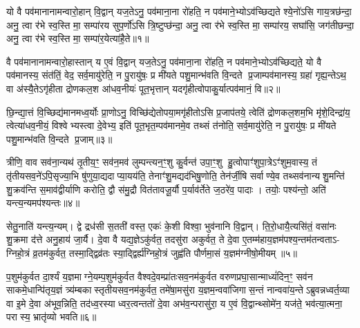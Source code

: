 \setcounter{anuvakam}{0}
यो वै पव॑मानानामन्वारो॒हान् वि॒द्वान् यज॒तेऽनु॒ पव॑माना॒ना रो॑हति॒ न पव॑माने॒भ्योऽव॑च्छिद्यते श्ये॒नो॑ऽसि गाय॒त्रछ॑न्दा॒ अनु॒ त्वा र॑भे स्व॒स्ति मा॒ सम्पा॑रय सुप॒र्णो॑ऽसि त्रि॒ष्टुप्छ॑न्दा॒ अनु॒ त्वा र॑भे स्व॒स्ति मा॒ सम्पा॑रय॒ सघा॑सि॒ जग॑तीछन्दा॒ अनु॒ त्वा र॑भे स्व॒स्ति मा॒ सम्पा॑र॒येत्या॑है॒ते॥१॥

वै पव॑मानानामन्वारो॒हास्तान् य ए॒वं वि॒द्वान् यज॒तेऽनु॒ पव॑माना॒ना रो॑हति॒ न पव॑माने॒भ्योऽव॑च्छिद्यते॒ यो वै पव॑मानस्य॒ संत॑तिं॒ वेद॒ सर्व॒मायु॑रेति॒ न पु॒रायु॑षः॒ प्र मी॑यते पशु॒मान्भ॑वति वि॒न्दते प्र॒जाम्पव॑मानस्य॒ ग्रहा॑ गृह्य॒न्तेऽथ॒ वा अ॑स्यै॒तेऽगृ॑हीता द्रोणकल॒श आ॑धव॒नीयः॑ पूत॒भृत्तान् यदगृ॑हीत्वोपाकु॒र्यात्पव॑मानं॒ वि॥२॥

छि॒न्द्या॒त्तं वि॒च्छिद्य॑मानमध्व॒र्योः प्रा॒णोऽनु॒ विच्छि॑द्येतोपया॒मगृ॑हीतोऽसि प्र॒जाप॑तये॒ त्वेति॑ द्रोणकल॒शम॒भि मृ॑शे॒दिन्द्रा॑य॒ त्वेत्या॑धव॒नीयं॒ विश्वेभ्यस्त्वा दे॒वेभ्य॒ इति॑ पूत॒भृत॒म्पव॑मानमे॒व तथ्सं त॑नोति॒ सर्व॒मायु॑रेति॒ न पु॒रायु॑षः॒ प्र मी॑यते पशु॒मान्भ॑वति वि॒न्दते प्र॒जाम्॥३॥

{\anuvakamend[{ए॒ते वि द्विच॑त्वारिशच्च॥१॥}]}

त्रीणि॒ वाव सव॑ना॒न्यथ॑ तृ॒तीय॒ꣳ॒ सव॑न॒मव॑ लुम्पन्त्यन॒ꣳ॒शु कु॒र्वन्त॑ उपा॒ꣳ॒शु हु॒त्वोपाꣳ॑शुपा॒त्रेऽꣳ॑शुम॒वास्य॒ तं तृ॑तीयसव॒ने॑ऽपि॒सृज्या॒भि षु॑णुया॒द्यदाप्या॒यय॑ति॒ तेनाꣳ॑शु॒मद्यद॑भिषु॒णोति॒ तेन॑र्जी॒षि सर्वाण्ये॒व तथ्सव॑नान्यशु॒मन्ति॑ शु॒क्रव॑न्ति स॒माव॑द्वीर्याणि करोति॒ द्वौ स॑मु॒द्रौ वित॑तावजू॒र्यौ प॒र्याव॑र्तेते ज॒ठरे॑व॒ पादाः। तयोः॒ पश्य॑न्तो॒ अति॑ यन्त्य॒न्यमप॑श्यन्तः॥४॥

सेतु॒नाति॑ यन्त्य॒न्यम्। द्वे द्रध॑सी स॒तती॑ वस्त॒ एकः॑ के॒शी विश्वा॒ भुव॑नानि वि॒द्वान्। ति॒रो॒धायै॒त्यसि॑तं॒ वसा॑नः शु॒क्रमा द॑त्ते अनु॒हाय॑ जा॒र्यै। दे॒वा वै यद्य॒ज्ञेऽकु॑र्वत॒ तदसु॑रा अकुर्वत॒ ते दे॒वा ए॒तम्म॑हाय॒ज्ञम॑पश्य॒न्तम॑तन्वताऽ- ग्निहो॒त्रं व्र॒तम॑कुर्वत॒ तस्मा॒द्द्विव्र॑तः स्या॒द्द्विर्\mbox{}ह्य॑ग्निहो॒त्रं जुह्व॑ति पौर्णमा॒सं य॒ज्ञम॑ग्नीषो॒मीयम्॥५॥

प॒शुम॑कुर्वत दा॒र्श्यं य॒ज्ञमाग्ने॒यम्प॒शुम॑कुर्वत वैश्वदे॒वम्प्रा॑तःसव॒नम॑कुर्वत वरुणप्रघा॒सान्माध्यं॑दिन॒ꣳ॒ सव॑न साकमे॒धान्पि॑तृय॒ज्ञं त्र्य॑म्बकास्तृतीयसव॒नम॑कुर्वत॒ तमे॑षा॒मसु॑रा य॒ज्ञम॒न्ववा॑जिगास॒न्तं नान्ववा॑य॒न्तेऽब्रुवन्नध्वर्त॒व्या वा इ॒मे दे॒वा अ॑भूव॒न्निति॒ तद॑ध्व॒रस्याध्वर॒त्वन्ततो॑ दे॒वा अभ॑व॒न्परासु॑रा॒ य ए॒वं वि॒द्वान्थ्सोमे॑न॒ यज॑ते॒ भव॑त्या॒त्मना॒ परास्य॒ भ्रातृ॑व्यो भवति॥६॥

{\anuvakamend[{अप॑श्यन्तोऽग्नीषो॒मीय॑मा॒त्मना॒ परा॒ त्रीणि॑ च॥२॥}]}

